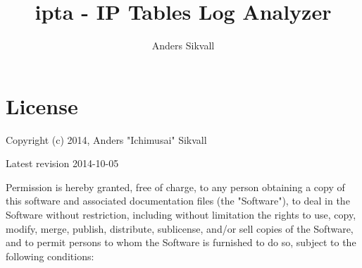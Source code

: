 \documentclass[12pt,a4paper]{report}
\author{Anders Sikvall}
\title{ipta - IP Tables Log Analyzer}
\begin{document}
\maketitle

\cleardoublepage

\tableofcontents

\chapter*{License}
\label{license}

Copyright (c) 2014, Anders "Ichimusai" Sikvall 

Latest revision 2014-10-05 
 
Permission is hereby granted, free of charge, to any person obtaining a copy of this software and associated documentation files (the "Software"), to deal in the Software without restriction, including without limitation the rights to use, copy, modify, merge, publish, distribute, sublicense, and/or sell copies of the Software, and to permit persons to whom the Software is furnished to do so, subject to the following conditions:  
\end{document}
